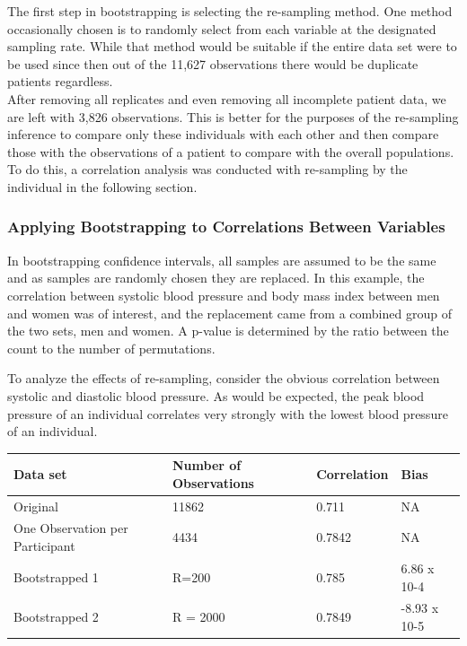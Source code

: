\documentclass{article}\usepackage[]{graphicx}\usepackage[]{color}
\begin{document}
The first step in bootstrapping is selecting the re-sampling method.  One method occasionally chosen is to randomly select from each variable at the designated sampling rate.  While that method would be suitable if the entire data set were to be used  since then out of the 11,627 observations there would be duplicate patients regardless.  \\

After removing all replicates and even removing all incomplete patient data, we are left with 3,826 observations. This is better for the purposes of the re-sampling inference to compare only these individuals with each other and then compare those with the observations of a patient to compare with the overall populations.  To do this, a correlation analysis was conducted with re-sampling by the individual in the following section.


\subsubsection*{Applying Bootstrapping to Correlations Between Variables}

In bootstrapping confidence intervals, all samples are assumed to be the same and as samples are randomly chosen they are replaced. In this example, the correlation between systolic blood pressure and body mass index between men and women was of interest, and the replacement came from a combined group of the two sets, men and women.  A p-value is determined by the ratio between the count to the number of permutations.

To analyze the effects of re-sampling, consider the obvious correlation between systolic and diastolic blood pressure.  As would be expected, the peak blood pressure of an individual correlates very strongly with the lowest blood pressure of an individual. 

\begin{table}[h]
\begin{small}
    \begin{tabular}{llll}
    \hline \textbf{Data set}             & \textbf{Number of Observations} & \textbf{Correlation} & \textbf{Bias}         \\ \hline
    Original               & 11862              & 0.711       & NA           \\
    One Observation per Participant            & 4434               & 0.7842      & NA           \\ 
    Bootstrapped 1 & R=200              & 0.785       & 6.86 x 10-4  \\
    Bootstrapped 2 & R = 2000           & 0.7849      & -8.93 x 10-5 \\
    \end{tabular}
    \end{small}
\end{table}
\end{document}
